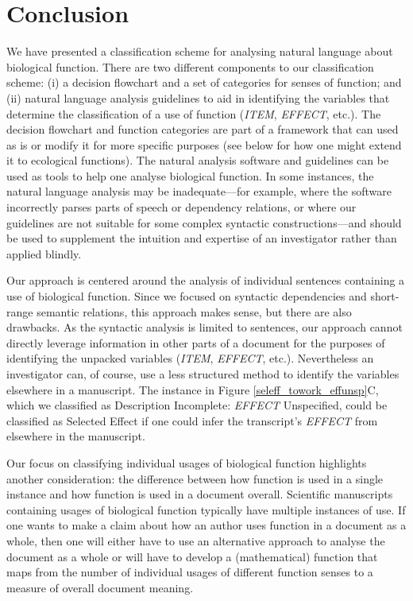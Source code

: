 \documentclass{article}
\begin{document}
\section{Conclusion}
\label{sec:conclusion}

We have presented a classification scheme for analysing natural language about biological function.
There are two different components to our classification scheme: (i) a decision flowchart and a set of categories for senses of function; and (ii) natural language analysis guidelines to aid in identifying the variables that determine the classification of a use of function (\emph{ITEM}, \emph{EFFECT}, etc.).
The decision flowchart and function categories are part of a framework that can used as is or modify it for more specific purposes (see below for how one might extend it to ecological functions).
The natural analysis software and guidelines can be used as tools to help one analyse biological function.
In some instances, the natural language analysis may be inadequate---for example, where the software incorrectly parses parts of speech or dependency relations, or where our guidelines are not suitable for some complex syntactic constructions---and should be used to supplement the intuition and expertise of an investigator rather than applied blindly.

Our approach is centered around the analysis of individual sentences containing a use of biological function.
Since we focused on syntactic dependencies and short-range semantic relations, this approach makes sense, but there are also drawbacks.
As the syntactic analysis is limited to sentences, our approach cannot directly leverage information in other parts of a document for the purposes of identifying the unpacked variables (\emph{ITEM}, \emph{EFFECT}, etc.).
Nevertheless an investigator can, of course, use a less structured method to identify the variables elsewhere in a manuscript.
The instance in Figure \ref{seleff_towork_effunsp}C, which we classified as Description Incomplete: \emph{EFFECT} Unspecified, could be classified as Selected Effect if one could infer the transcript's \emph{EFFECT} from elsewhere in the manuscript.

Our focus on classifying individual usages of biological function highlights another consideration: the difference between how function is used in a single instance and how function is used in a document overall.
Scientific manuscripts containing usages of biological function typically have multiple instances of use.
If one wants to make a claim about how an author uses function in a document as a whole, then one will either have to use an alternative approach to analyse the document as a whole or will have to develop a (mathematical) function that maps from the number of individual usages of different function senses to a measure of overall document meaning.
\end{document}

